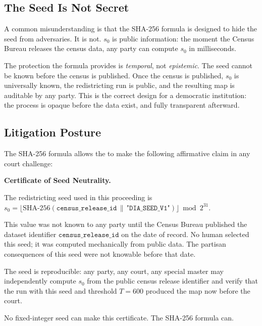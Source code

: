 \subsection{The Seed Is Not Secret}

A common misunderstanding is that the SHA-256 formula is designed to hide the
seed from adversaries.
It is not.
$s_0$ is public information: the moment the Census Bureau releases the census
data, any party can compute $s_0$ in milliseconds.

The protection the formula provides is \emph{temporal}, not \emph{epistemic}.
The seed cannot be known before the census is published.
Once the census is published, $s_0$ is universally known, the redistricting
run is public, and the resulting map is auditable by any party.
This is the correct design for a democratic institution: the process is opaque
before the data exist, and fully transparent afterward.

\subsection{Litigation Posture}

The SHA-256 formula allows the \dia{} to make the following affirmative claim
in any court challenge:

\begin{statute}
\textbf{Certificate of Seed Neutrality.}

The redistricting seed used in this proceeding is
$s_0 = \lfloor \mathrm{SHA\text{-}256}(\texttt{census\_release\_id} \,\|\,
\texttt{"DIA\_SEED\_V1"}) \rfloor \bmod 2^{31}$.

\medskip

This value was not known to any party until the Census Bureau published the
dataset identifier $\mathtt{census\_release\_id}$ on the date of record.
No human selected this seed; it was computed mechanically from public data.
The partisan consequences of this seed were not knowable before that date.

\medskip

The seed is reproducible: any party, any court, any special master may
independently compute $s_0$ from the public census release identifier and
verify that the \cs{} run with this seed and threshold $T = 600$ produced the
map now before the court.
\end{statute}

No fixed-integer seed can make this certificate.
The SHA-256 formula can.
